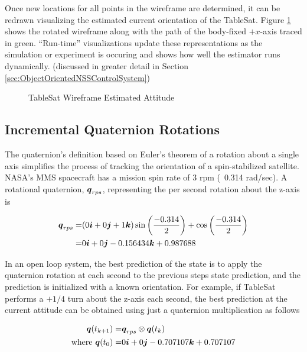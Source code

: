 Once new locations for all points in the wireframe are determined, it can be redrawn visualizing the estimated current orientation of the TableSat.  Figure \ref{fig:TSatWireframeEstimatedAttitude} shows the rotated wireframe along with the path of the body-fixed $+x$-axis traced in green.  ``Run-time'' visualizations update these representations as the simulation or experiment is occuring and shows how well the estimator runs dynamically. (discussed in greater detail in Section \ref{sec:ObjectOrientedNSSControlSystem})

\begin{figure}[H]
  \centerline{}
  \caption{TableSat Wireframe Estimated Attitude}
  \label{fig:TSatWireframeEstimatedAttitude}
\end{figure}


\subsection{Incremental Quaternion Rotations}
\label{subsubsec:IncrementalQuaternionRotations}

The quaternion's definition based on Euler's theorem of a rotation about a single axis simplifies the process of tracking the orientation of a spin-stabilized satellite.  NASA's MMS spacecraft has a mission spin rate of 3 rpm (~0.314 rad/sec).  A rotational quaternion, $\boldsymbol{q}_{rps}$, representing the per second rotation about the z-axis is

\begin{equation}
  \begin{aligned}
    \boldsymbol{q}_{rps} = & ( 0\boldsymbol{i} + 0\boldsymbol{j} + 1\boldsymbol{k} ) \sin \left( \frac{-0.314}{2} \right) + \cos \left( \frac{-0.314}{2} \right) \\
    = & 0\boldsymbol{i} +0\boldsymbol{j} -0.156434\boldsymbol{k} + 0.987688
  \end{aligned}
\end{equation}

In an open loop system, the best prediction of the state is to apply the quaternion rotation at each second to the previous steps state prediction, and the prediction is initialized with a known orientation.  For example, if TableSat performs a $+1/4$ turn about the z-axis each second, the best prediction at the current attitude can be obtained using just a quaternion multiplication as follows

\begin{equation}
  \begin{aligned}
    \boldsymbol{q}(t_{k+1}) = & \boldsymbol{q}_{rps} \otimes \boldsymbol{q}(t_{k}) \\
    \text{where } \boldsymbol{q}(t_0) = & 0 \boldsymbol{i} +0 \boldsymbol{j} -0.707107 \boldsymbol{k} +0.707107
  \end{aligned}
  \label{eqn:3rpmQuaternionEquation}
\end{equation}

